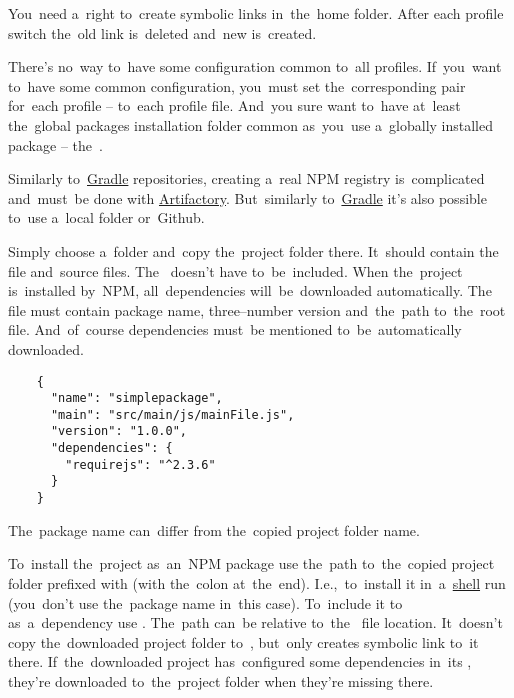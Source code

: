 \warning You~need a~right to~create symbolic links in~the~home folder.
After each profile switch the~old  link is~deleted and~new is~created.

\warning There's no~way to~have some configuration common to~all profiles.
If~you~want to~have some common configuration, you~must set the~corresponding  pair for~each profile -- to~each profile file.
And~you sure want to~have at~least the~global packages installation folder common as~you~use a~globally installed package -- the~.

Similarly to~\hyperref[gradle]{Gradle} repositories, creating a~real NPM registry is~complicated and~must~be done with \href{https://jfrog.com/artifactory/}{Artifactory}.
But~similarly to~\hyperref[gradle]{Gradle} it's also possible to~use a~local folder or~Github.

\label{npmpublishlocal}
Simply choose a~folder and~copy the~project folder there.
It~should contain the~ file and~source files.
The~ doesn't have to~be~included.
When the~project is~installed by~NPM, all~dependencies will~be~downloaded automatically.
The~ file must contain package name, three--number version and~the~path to~the~root file.
And~of~course dependencies must~be mentioned to~be~automatically downloaded.

\begin{lstlisting}
    {
      "name": "simplepackage",
      "main": "src/main/js/mainFile.js",
      "version": "1.0.0",
      "dependencies": {
        "requirejs": "^2.3.6"
      }
    }
\end{lstlisting}

\note The~package name can~differ from the~copied project folder name.
\newline

\noindent To~install the~project as~an~NPM package use the~path to~the~copied project folder prefixed with  (with the~colon at~the~end).
I.e.,~to~install it in~a~\hyperref[shellcligui]{shell} run  (you~don't use the~package name in~this case).
To~include it to~ as~a~dependency use .
The~path can~be relative to~the~ file location.
It~doesn't copy the~downloaded project folder to~, but~only creates symbolic link to~it there.
If~the~downloaded project has~configured some dependencies in~its , they're downloaded to~the~project folder when they're missing there.

